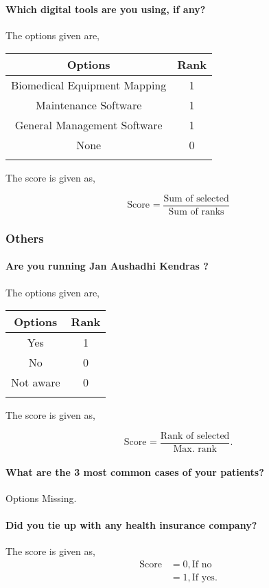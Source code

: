 \documentclass[oneside]{article}
\newcommand{\tsub}[2]{\text{#1}_{\text{#2}}}
\newcommand{\dsub}[2]{\dfrac{\text{#1}}{\text{#2}}}
\newcommand{\multsel}[1]
{
	\[
		\tsub{Score}{#1} = \dsub{Sum of selected}{Sum of ranks}
	\]
}
\newcommand{\singsel}[1]
{
	\[
		\tsub{Score}{#1} = \dsub{Rank of selected}{Max. rank}.
	\]
}
\newenvironment{ttable}
{
\begin{center}
\begin{tabular}{c|c}
\hline
}
{
\\ \hline
\end{tabular}
\end{center}
}
\begin{document}
\paragraph{ Which digital tools are you using, if any?}

The options given are,
\begin{ttable}
Options & Rank \\ \hline
Biomedical Equipment Mapping & 1 \\
Maintenance Software & 1 \\
General Management Software & 1 \\
None & 0 \\
\hline
\end{ttable}
The score is given as,
\multsel{}
\subsubsection{Others}

\paragraph{ Are you running Jan Aushadhi Kendras ?}

The options given are,
\begin{ttable}
Options & Rank \\ \hline
Yes & 1 \\
No & 0 \\
Not aware & 0 \\
\hline
\end{ttable}
The score is given as,
\singsel{}
\paragraph{ What are the 3 most common cases of your patients?}
Options Missing.
\paragraph{ Did you tie up with any health insurance company?}

The score is given as,
\begin{align*}
\tsub{Score}{} &= 0, \text{If no} \\
        &= 1, \text{If yes}.
\end{align*}
\end{document}
